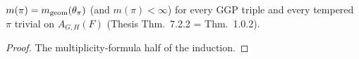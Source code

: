 \begin{theorem}
\label{multiplicityFormula_of_traceFormula}
\leanok
{}
$m(\pi)=m_{\mathrm{geom}}(\theta_\pi)$ (and $m(\pi)<\infty$) for every GGP triple and every tempered $\pi$ trivial on
$A_{G,H}(F)$ (Thesis Thm.~7.2.2 = Thm.~1.0.2).
\end{theorem}
\begin{proof}
\leanok
{}
The multiplicity-formula half of the induction.
\end{proof}

